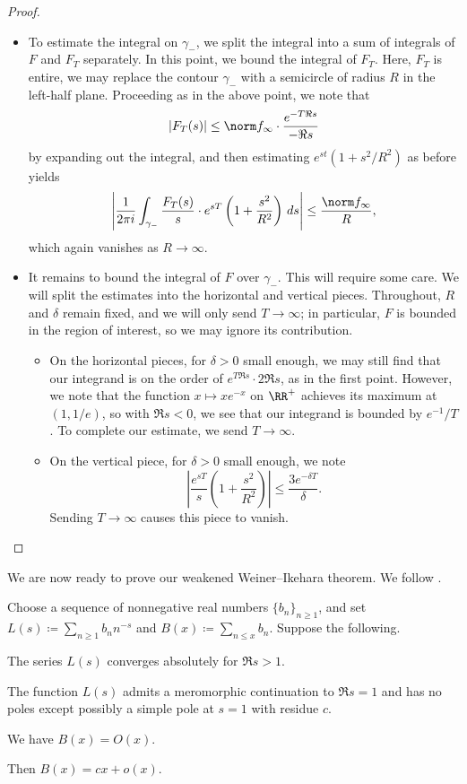 \documentclass[../thesis.tex]{subfiles}
\begin{document}
\begin{proof}
\begin{itemize}
		\item To estimate the integral on $\gamma_-$, we split the integral into a sum of integrals of $F$ and $F_T$ separately. In this point, we bound the integral of $F_T$. Here, $F_T$ is entire, we may replace the contour $\gamma_-$ with a semicircle of radius $R$ in the left-half plane. Proceeding as in the above point, we note that
		\[\left|F_T(s)\right|\le\norm f_\infty\cdot\frac{e^{-T\Re s}}{-\Re s}\]
		by expanding out the integral, and then estimating $e^{st}\left(1+s^2/R^2\right)$ as before yields
		\[\left|\frac1{2\pi i}\int_{\gamma_-}\frac{F_T(s)}s\cdot e^{sT}\left(1+\frac{s^2}{R^2}\right)\,ds\right|\le\frac{\norm f_\infty}R,\]
		which again vanishes as $R\to\infty$.
		\item It remains to bound the integral of $F$ over $\gamma_-$. This will require some care. We will split the estimates into the horizontal and vertical pieces. Throughout, $R$ and $\delta$ remain fixed, and we will only send $T\to\infty$; in particular, $F$ is bounded in the region of interest, so we may ignore its contribution.
		\begin{itemize}
			\item On the horizontal pieces, for $\delta>0$ small enough, we may still find that our integrand is on the order of $e^{T\Re s}\cdot 2\Re s$, as in the first point. However, we note that the function $x\mapsto xe^{-x}$ on $\RR^+$ achieves its maximum at $(1,1/e)$, so with $\Re s<0$, we see that our integrand is bounded by $e^{-1}/T$. To complete our estimate, we send $T\to\infty$.
			\item On the vertical piece, for $\delta>0$ small enough, we note
			\[\left|\frac{e^{sT}}s\left(1+\frac{s^2}{R^2}\right)\right|\le\frac{3e^{-\delta T}}\delta.\]
			Sending $T\to\infty$ causes this piece to vanish.
			\qedhere
		\end{itemize}
	\end{itemize}
\end{proof}
We are now ready to prove our weakened Weiner--Ikehara theorem. We follow \cite[Theorem~2]{vatwani-wi-tauber}.
\begin{theorem} \label{thm:wi}
	Choose a sequence of nonnegative real numbers $\{b_n\}_{n\ge1}$, and set $L(s)\coloneqq\sum_{n\ge1}b_nn^{-s}$ and $B(x)\coloneqq\sum_{n\le x}b_n$. Suppose the following.
	\begin{listroman}
		\item The series $L(s)$ converges absolutely for $\Re s>1$.
		\item The function $L(s)$ admits a meromorphic continuation to $\Re s=1$ and has no poles except possibly a simple pole at $s=1$ with residue $c$.
		\item We have $B(x)=O(x)$.
	\end{listroman}
	Then $B(x)=cx+o(x)$.
\end{theorem}
\end{document}
